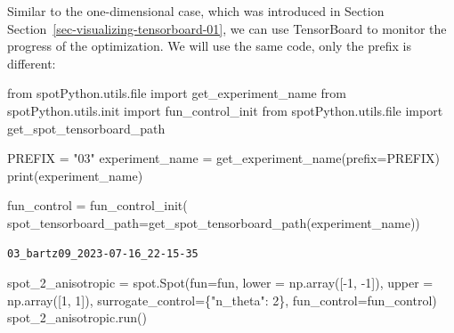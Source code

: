 \documentclass[
  letterpaper,
  DIV=11,
  numbers=noendperiod]{scrreprt}
\newenvironment{Shaded}{\begin{snugshade}}{\end{snugshade}}
\newcommand{\BuiltInTok}[1]{\textcolor[rgb]{0.00,0.23,0.31}{#1}}
\newcommand{\DecValTok}[1]{\textcolor[rgb]{0.68,0.00,0.00}{#1}}
\newcommand{\ImportTok}[1]{\textcolor[rgb]{0.00,0.46,0.62}{#1}}
\newcommand{\NormalTok}[1]{\textcolor[rgb]{0.00,0.23,0.31}{#1}}
\newcommand{\OperatorTok}[1]{\textcolor[rgb]{0.37,0.37,0.37}{#1}}
\newcommand{\StringTok}[1]{\textcolor[rgb]{0.13,0.47,0.30}{#1}}
\begin{document}
\begin{tcolorbox}[enhanced jigsaw, left=2mm, title=\textcolor{quarto-callout-note-color}{\faInfo}\hspace{0.5em}{TensorBoard}, titlerule=0mm, toprule=.15mm, leftrule=.75mm, colbacktitle=quarto-callout-note-color!10!white, colback=white, arc=.35mm, toptitle=1mm, bottomtitle=1mm, colframe=quarto-callout-note-color-frame, bottomrule=.15mm, rightrule=.15mm, breakable, coltitle=black, opacitybacktitle=0.6, opacityback=0]

Similar to the one-dimensional case, which was introduced in Section
Section~\ref{sec-visualizing-tensorboard-01}, we can use TensorBoard to
monitor the progress of the optimization. We will use the same code,
only the prefix is different:

\begin{Shaded}
\begin{Highlighting}[]
\ImportTok{from}\NormalTok{ spotPython.utils.}\BuiltInTok{file} \ImportTok{import}\NormalTok{ get\_experiment\_name}
\ImportTok{from}\NormalTok{ spotPython.utils.init }\ImportTok{import}\NormalTok{ fun\_control\_init}
\ImportTok{from}\NormalTok{ spotPython.utils.}\BuiltInTok{file} \ImportTok{import}\NormalTok{ get\_spot\_tensorboard\_path}

\NormalTok{PREFIX }\OperatorTok{=} \StringTok{"03"}
\NormalTok{experiment\_name }\OperatorTok{=}\NormalTok{ get\_experiment\_name(prefix}\OperatorTok{=}\NormalTok{PREFIX)}
\BuiltInTok{print}\NormalTok{(experiment\_name)}

\NormalTok{fun\_control }\OperatorTok{=}\NormalTok{ fun\_control\_init(}
\NormalTok{    spot\_tensorboard\_path}\OperatorTok{=}\NormalTok{get\_spot\_tensorboard\_path(experiment\_name))}
\end{Highlighting}
\end{Shaded}

\begin{verbatim}
03_bartz09_2023-07-16_22-15-35
\end{verbatim}

\end{tcolorbox}

\begin{Shaded}
\begin{Highlighting}[]
\NormalTok{spot\_2\_anisotropic }\OperatorTok{=}\NormalTok{ spot.Spot(fun}\OperatorTok{=}\NormalTok{fun,}
\NormalTok{                   lower }\OperatorTok{=}\NormalTok{ np.array([}\OperatorTok{{-}}\DecValTok{1}\NormalTok{, }\OperatorTok{{-}}\DecValTok{1}\NormalTok{]),}
\NormalTok{                   upper }\OperatorTok{=}\NormalTok{ np.array([}\DecValTok{1}\NormalTok{, }\DecValTok{1}\NormalTok{]),}
\NormalTok{                   surrogate\_control}\OperatorTok{=}\NormalTok{\{}\StringTok{"n\_theta"}\NormalTok{: }\DecValTok{2}\NormalTok{\},}
\NormalTok{                   fun\_control}\OperatorTok{=}\NormalTok{fun\_control)}
\NormalTok{spot\_2\_anisotropic.run()}
\end{Highlighting}
\end{Shaded}
\end{document}
